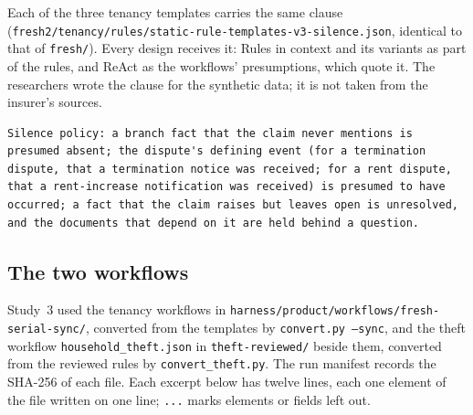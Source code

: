 Each of the three tenancy templates carries the same clause (\texttt{fresh2/\allowbreak{}tenancy/\allowbreak{}rules/\allowbreak{}static-\allowbreak{}rule-\allowbreak{}templates-\allowbreak{}v3-\allowbreak{}silence.json}, identical to that of \texttt{fresh/}). Every design receives it: Rules in context and its variants as part of the rules, \casepath and ReAct as the workflows' presumptions, which quote it. The researchers wrote the clause for the synthetic data; it is not taken from the insurer's sources.

\begin{lstlisting}[title={\textbf{Silence clause of the tenancy templates} (verbatim)}]
Silence policy: a branch fact that the claim never mentions is presumed absent; the dispute's defining event (for a termination dispute, that a termination notice was received; for a rent dispute, that a rent-increase notification was received) is presumed to have occurred; a fact that the claim raises but leaves open is unresolved, and the documents that depend on it are held behind a question.
\end{lstlisting}

\subsection{The two workflows}
\label{app:workflow-excerpts}

Study~3 used the tenancy workflows in \texttt{harness/\allowbreak{}product/\allowbreak{}workflows/\allowbreak{}fresh-\allowbreak{}serial-\allowbreak{}sync/}, converted from the templates by \texttt{convert.py --sync}, and the theft workflow \texttt{household\_theft.json} in \texttt{theft-reviewed/} beside them, converted from the reviewed rules by \texttt{convert\_theft.py}. The run manifest records the SHA-256 of each file. Each excerpt below has twelve lines, each one element of the file written on one line; \texttt{...} marks elements or fields left out.

